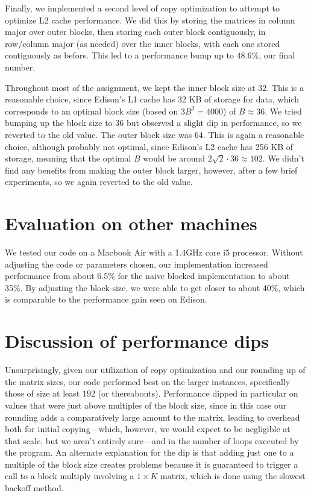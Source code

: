 \documentclass[12pt]{article}
\begin{document}
Finally, we implemented a second level of copy optimization to attempt to optimize L2 cache performance. We did this by storing the matrices in column major over outer blocks, then storing each outer block contiguously, in row/column major (as needed) over the inner blocks, with each one stored contiguously as before.
This led to a performance bump up to $48.6\%$, our final number.

Throughout most of the assignment, we kept the inner block size at $32$. This is a reasonable choice, since Edison's L1 cache has 32 KB of storage for data, which corresponds to an optimal block size (based on $3B^{2} = 4000$) of $B \approx 36$. We tried bumping up the block size to $36$ but observed a slight dip in
performance, so we reverted to the old value. The outer block size was $64$. This is again a reasonable choice, although probably not optimal, since Edison's L2 cache has 256 KB of storage, meaning that the optimal $B$ would be around $2\sqrt{2} \cdot 36 \approx 102$. We didn't find any benefits from making the outer
block larger, however, after a few brief experiments, so we again reverted to the old value.

\section{Evaluation on other machines}

We tested our code on a Macbook Air with a 1.4GHz core i5 processor. Without adjusting the code or parameters chosen, our implementation increased performance from about 6.5\% for the naive blocked implementation to about 35\%. By adjusting the block-size, we were able to get closer to about 40\%, 
which is comparable to the performance gain seen on Edison.

\section{Discussion of performance dips}


Unsurprisingly, given our utilization of copy optimization and our rounding up of the matrix sizes, our code performed best on the larger instances, specifically those of size at least $192$ (or thereabouts). Performance dipped in particular on values that were just above multiples of the block size, since in this case
our rounding adds a comparatively large amount to the matrix, leading to overhead both for initial copying---which, however, we would expect to be negligible at that scale, but we aren't entirely sure---and in the number of loops executed by the program. An alternate explanation for the dip is that adding just one to
a multiple of the block size creates problems because it is guaranteed to trigger a call to a block multiply involving a $1 \times K$ matrix, which is done using the slowest backoff method.
\end{document}
